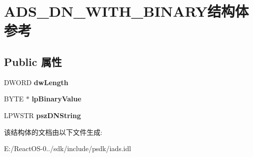 \hypertarget{struct_a_d_s___d_n___w_i_t_h___b_i_n_a_r_y}{}\section{A\+D\+S\+\_\+\+D\+N\+\_\+\+W\+I\+T\+H\+\_\+\+B\+I\+N\+A\+R\+Y结构体 参考}
\label{struct_a_d_s___d_n___w_i_t_h___b_i_n_a_r_y}
\subsection*{Public 属性}
\begin{DoxyCompactItemize}
\item 
\mbox{\label{struct_a_d_s___d_n___w_i_t_h___b_i_n_a_r_y_ac58986573d5fc9887d5fe005db5e6aaf}} 
D\+W\+O\+RD {\bfseries dw\+Length}
\item 
\mbox{\label{struct_a_d_s___d_n___w_i_t_h___b_i_n_a_r_y_a03be5239bdecdc713aad4a6a70da9dc6}} 
B\+Y\+TE $\ast$ {\bfseries lp\+Binary\+Value}
\item 
\mbox{\label{struct_a_d_s___d_n___w_i_t_h___b_i_n_a_r_y_a5145812c4d7376fb90f23e987df12ad5}} 
L\+P\+W\+S\+TR {\bfseries psz\+D\+N\+String}
\end{DoxyCompactItemize}


该结构体的文档由以下文件生成\+:\begin{DoxyCompactItemize}
\item 
E\+:/\+React\+O\+S-\/0../sdk/include/psdk/iads.\+idl\end{DoxyCompactItemize}
